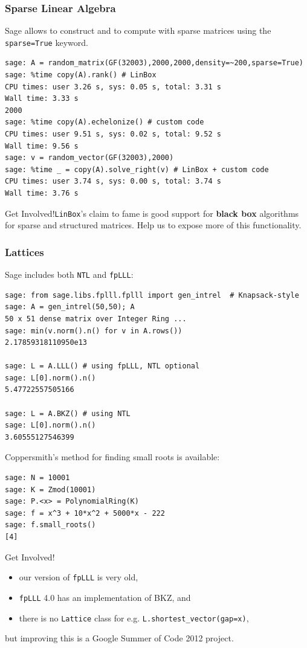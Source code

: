 \documentclass[10pt]{beamer}
\renewcommand{\emph}[1]{\textbf{\color{oxygenblue}#1}}
\newcommand{\getinvolved}[1]{\begin{block}{Get Involved!}#1\end{block}}
\begin{document}
\begin{frame}[fragile]
\frametitle{Sparse Linear Algebra}

Sage allows to construct and to compute with sparse matrices using the {\tt sparse=True} keyword.

\begin{lstlisting}
sage: A = random_matrix(GF(32003),2000,2000,density=~200,sparse=True)
sage: %time copy(A).rank() # LinBox
CPU times: user 3.26 s, sys: 0.05 s, total: 3.31 s
Wall time: 3.33 s
2000
sage: %time copy(A).echelonize() # custom code
CPU times: user 9.51 s, sys: 0.02 s, total: 9.52 s
Wall time: 9.56 s
sage: v = random_vector(GF(32003),2000)
sage: %time _ = copy(A).solve_right(v) # LinBox + custom code
CPU times: user 3.74 s, sys: 0.00 s, total: 3.74 s
Wall time: 3.76 s
\end{lstlisting}

\getinvolved{\texttt{LinBox}'s claim to fame is good support for \emph{black box} algorithms for sparse and structured matrices. Help us to expose more of this functionality.}
\end{frame}

\begin{frame}
\frametitle{Lattices}
Sage includes both \texttt{NTL} and \texttt{fpLLL}:

\begin{lstlisting}
sage: from sage.libs.fplll.fplll import gen_intrel  # Knapsack-style
sage: A = gen_intrel(50,50); A
50 x 51 dense matrix over Integer Ring ...
sage: min(v.norm().n() for v in A.rows())
2.17859318110950e13

sage: L = A.LLL() # using fpLLL, NTL optional
sage: L[0].norm().n()
5.47722557505166

sage: L = A.BKZ() # using NTL
sage: L[0].norm().n()
3.60555127546399
\end{lstlisting}

\framebreak

Coppersmith's method for finding small roots is available:

\begin{lstlisting}
sage: N = 10001
sage: K = Zmod(10001)
sage: P.<x> = PolynomialRing(K)
sage: f = x^3 + 10*x^2 + 5000*x - 222
sage: f.small_roots()
[4]
\end{lstlisting}

\getinvolved{
\begin{itemize}
 \item our version of {\tt fpLLL} is very old,
 \item {\tt fpLLL} 4.0 has an implementation of BKZ, and
 \item there is no \texttt{Lattice} class for e.g. \texttt{L.shortest\_vector(gap=x)},
\end{itemize}
 but improving this is a Google Summer of Code 2012 project.}


\end{frame}
\end{document}
